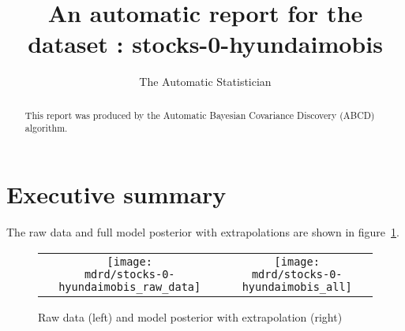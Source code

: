 \documentclass{article} %
\title{An automatic report for the dataset : stocks-0-hyundaimobis}
\author{
The Automatic Statistician
}
\begin{document}
\allowdisplaybreaks

\maketitle

\begin{abstract}
This report was produced by the Automatic Bayesian Covariance Discovery (ABCD) algorithm.
\end{abstract}

\section{Executive summary}

The raw data and full model posterior with extrapolations are shown in figure~\ref{fig:rawandfit}.

\begin{figure}[H]
\newcommand{\wmgd}{0.5\columnwidth}
\newcommand{\hmgd}{3.0cm}
\newcommand{\mdrd}{stocks-0-hyundaimobis}
\newcommand{\mbm}{\hspace{-0.3cm}}
\begin{tabular}{cc}
\mbm \texttt{[image: \\mdrd/stocks-0-hyundaimobis\_raw\_data]} & \texttt{[image: \\mdrd/stocks-0-hyundaimobis\_all]}
\end{tabular}
\caption{Raw data (left) and model posterior with extrapolation (right)}
\label{fig:rawandfit}
\end{figure}
\end{document}

